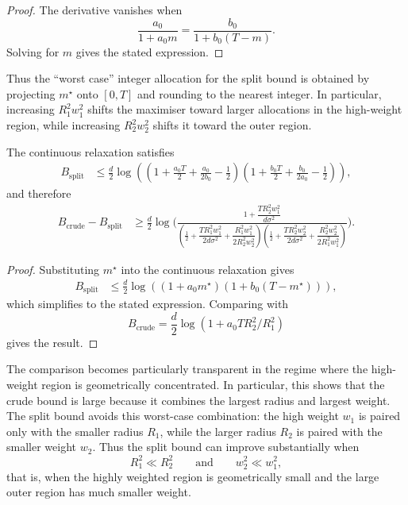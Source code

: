 \begin{proof}
The derivative vanishes when
\begin{equation*}
\frac{a_0}{1+a_0m}
=
\frac{b_0}{1+b_0(T-m)}.
\end{equation*}
Solving for $m$ gives the stated expression.
\end{proof}
Thus the ``worst case'' integer allocation for the split bound is obtained by projecting $m^\star$ onto $[0,T]$ and rounding to the nearest integer. In particular, increasing $R_1^2w_1^2$ shifts the maximiser toward larger allocations in the high-weight region, while increasing $R_2^2w_2^2$ shifts it toward the outer region.

\begin{corollary}
The continuous relaxation satisfies
\begin{align*}
B_{\mathrm{split}}
&\leq
\frac{d}{2}
\log
\left(
\left(
1+\frac{a_0T}{2}+\frac{a_0}{2b_0}-\frac12
\right)
\left(
1+\frac{b_0T}{2}+\frac{b_0}{2a_0}-\frac12
\right)
\right),
\end{align*}
and therefore
\begin{align*}
B_{\mathrm{crude}}-B_{\mathrm{split}}
&\geq
\frac{d}{2}
\log
\Bigg(
\frac{
1+\dfrac{TR_2^2w_1^2}{d\sigma^2}
}{
\left(
\frac12
+
\dfrac{TR_1^2w_1^2}{2d\sigma^2}
+
\dfrac{R_1^2w_1^2}{2R_2^2w_2^2}
\right)
\left(
\frac12
+
\dfrac{TR_2^2w_2^2}{2d\sigma^2}
+
\dfrac{R_2^2w_2^2}{2R_1^2w_1^2}
\right)
}
\Bigg).
\end{align*}
\end{corollary}

\begin{proof}
Substituting $m^\star$ into the continuous relaxation gives
\begin{align*}
B_{\mathrm{split}}
&\leq
\frac{d}{2}
\log
\left(
\left(
1+a_0 m^\star
\right)
\left(
1+b_0(T-m^\star)
\right)
\right),
\end{align*}
which simplifies to the stated expression. Comparing with
\begin{equation*}
B_{\mathrm{crude}}
=
\frac{d}{2}
\log(1+a_0TR_2^2/R_1^2)
\end{equation*}
gives the result.
\end{proof}

The comparison becomes particularly transparent in the regime where the high-weight region is geometrically concentrated.
In particular, this shows that the crude bound is large because it combines the largest radius and largest weight. The split bound avoids this worst-case combination: the high weight $w_1$ is paired only with the smaller radius $R_1$, while the larger radius $R_2$ is paired with the smaller weight $w_2$. Thus the split bound can improve substantially when
\begin{equation*}
R_1^2
\ll
R_2^2
\qquad
\text{and}
\qquad
w_2^2
\ll
w_1^2,
\end{equation*}
that is, when the highly weighted region is geometrically small and the large outer region has much smaller weight.

